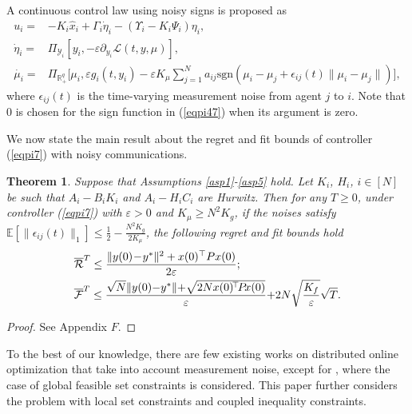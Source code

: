 \documentclass[final,5p,times,twocolumn,authoryear]{elsarticle}
\newtheorem{theorem}{ {Theorem}}
\newcommand{\sign}[1]{\mathrm{sgn}(#1)}
\begin{document}
	
	A continuous control law using noisy signs is proposed as
	\begin{subequations}\label{eqpi7}
		\begin{align}
			u_i=&-K_{i} \hat{x}_i+\Gamma_i\dot{\eta}_i - (\Upsilon_i - K_i\Psi_i)\eta_i, \label{eqpi7z}\\
			\dot{\eta}_i=&\Pi_{\mathcal{Y}_i}[y_i, -\varepsilon \partial_{y_i}\mathcal{L}(t,y,\mu)],\label{eqpi7a}\\
			\dot{\mu_i}=&\Pi_{\mathbb{R}_+^q}\Big[\mu_i,\varepsilon g_i(t,y_i){-}\varepsilon K_\mu \sum_{j=1}^N a_{ij} \sign{\mu_i{-}\mu_j{+}\epsilon_{ij}(t)\|\mu_i{-}\mu_j\|}\Big], \label{eqpi47}
		\end{align}
	\end{subequations}
	where $\epsilon_{ij}(t)$ is the time-varying measurement noise from agent $j$ to $i$. Note that $0$ is chosen for the sign function in (\ref{eqpi47}) when its argument is zero.
	
	
	
	We now state the main result about the regret and fit bounds of controller (\ref{eqpi7}) with noisy communications.
	
	\begin{theorem}\label{th7}
		Suppose that Assumptions \ref{asp1}-\ref{asp5} hold. Let $K_i$, $H_i$, $i\in[N]$ be such that $A_i-B_iK_i$ and $A_i-H_iC_i$ are Hurwitz. Then for any $T\ge0$, under controller (\ref{eqpi7}) with $\varepsilon>0$ and $K_\mu \ge N^2K_g$, if the noises satisfy $\mathbb{E}\left[\|\epsilon_{ij}(t)\|_1\right]\le \frac{1}{2}-\frac{N^2K_g}{2K_\mu}$, the following regret and fit bounds hold
		\begin{align}
			&\overline{\mathcal{R}}^T\le 
			\frac{\|y(0)\!-\!y^*\|^2 + x(0)^\top P x(0)}{2\varepsilon};\notag\\
			&\overline{\mathcal{F}}^T\le \frac{\sqrt{N}\|y(0){-}y^*\| {+}\sqrt{2N x(0)^{\!\top} \!P\! x(0)}}{\varepsilon}  {+}  2N\sqrt{\frac{K_f}{\varepsilon}}\sqrt{T}.\notag	
		\end{align}
	\end{theorem}
	
	
	\begin{proof}
		See Appendix $F$.	
	\end{proof}
	
	
	\begin{remark}
		To the best of our knowledge, there are few existing works on distributed online optimization that take into account measurement noise, except for \citet{cao2021}, where the case of global feasible set constraints is considered. This paper further considers the problem with  local set constraints and coupled inequality constraints.
	\end{remark}
\end{document}

